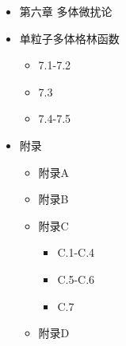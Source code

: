 \begin{itemize}
	    \begin{itemize}
	        \item[\DSquare] 5.1
	        \item[\DSquare] 5.2
	        \begin{itemize}
				\item [\CheckedBox] 5.2.1
				\item [\CheckedBox] 5.2.2
				\item [\Square] 5.2.3-5.2.4
			\end{itemize}
			\item[\Square] 5.3
	    \end{itemize}
    \item[\CheckedBox] 第六章 多体微扰论 
    \item[\DSquare] 单粒子多体格林函数 
    	\begin{itemize}
	        \item[\CheckedBox] 7.1-7.2
	        \item[\DSquare] 7.3
	        \item[\Square] 7.4-7.5 
    	\end{itemize}
    \item[\DSquare]  附录 \begin{itemize}
        \item[\CheckedBox] 附录A
        \item[\CheckedBox] 附录B
        \item[\DSquare] 附录C
        \begin{itemize}
	        \item[\CheckedBox] C.1-C.4
	        \item[\Square] C.5-C.6 
	        \item[\CheckedBox] C.7
    	\end{itemize}
        \item[\CheckedBox] 附录D
    \end{itemize}
\end{itemize}
